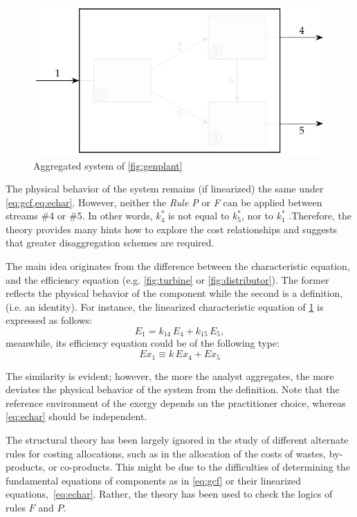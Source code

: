\documentclass[energies,article,submit,moreauthors,pdftex]{Definitions/mdpi}
\begin{document}
\begin{figure}[h]
    \centering
    \includegraphics[scale=0.9]{genplanta}
    \caption{Aggregated system of \cref{fig:genplant}}
    \label{fig:genplanta}
\end{figure}
The physical behavior of the system remains (if linearized) the same under \cref{eq:gcf,eq:echar}. However, neither the \emph{Rule P} or \emph{F} can be applied between streams \#4 or \#5. In other words, $k_4^*$ is not equal to $k_5^*$, nor to $k_1^*$ .Therefore, the theory provides many hints how to explore the cost relationships and suggests that greater disaggregation schemes are required.

The main idea originates from the difference between the characteristic equation, and the efficiency equation (e.g. \cref{fig:turbine} or \cref{fig:distributor}). The former reflects the physical behavior of the component while the second is a definition, (i.e. an identity). For instance, the linearized characteristic equation of \cref{fig:genplanta} is expressed as follows:
\[
    E_1=k_{14}\,E_4 + k_{15}\,E_5,
\]
meanwhile, its efficiency equation could be of the following type:
\[
   Ex_{1} \equiv k\,Ex_{4}+Ex_{5}
\]

The similarity is evident; however, the more the analyst aggregates, the more deviates the physical behavior of the system from the definition. Note that the reference environment of the exergy depends on the practitioner choice, whereas \cref{eq:echar} should be independent.

The structural theory \cite{Valero1992a,Valero1993} has been largely ignored in the study of different alternate rules for costing allocations, such as in the allocation of the costs of wastes, by-products, or co-products. This might be due to the difficulties of determining the fundamental equations of components as in \cref{eq:gcf} or their linearized equations,~\cref{eq:echar}. Rather, the theory has been used to check the logics of rules $F$ and $P$.
\end{document}
